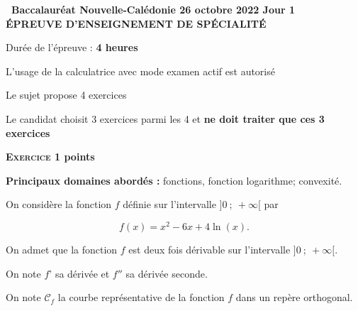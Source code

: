 \documentclass[10pt,a4paper]{article}
\begin{document}
\begin{center}{\Large\textbf{\decofourleft~Baccalauréat Nouvelle-Calédonie 26 octobre 2022 Jour 1~\decofourright\\[7pt] ÉPREUVE D'ENSEIGNEMENT DE SPÉCIALITÉ }}

\bigskip

Durée de l'épreuve : \textbf{4 heures}

\medskip

L'usage de la calculatrice avec mode examen actif est autorisé

\medskip

Le sujet propose 4 exercices

Le candidat choisit 3 exercices parmi les 4 et \textbf{ne doit traiter que ces 3 exercices}
\end{center}

\bigskip

\textbf{\textsc{Exercice 1}  points\hfill}

\medskip

\textbf{Principaux domaines abordés :} fonctions, fonction logarithme; convexité.

\medskip

On considère la fonction $f$ définie sur l'intervalle $]0~;~+\infty[$ par

\[f(x) = x^2 - 6x + 4\ln (x).\]

On admet que la fonction $f$ est deux fois dérivable sur l'intervalle $]0~;~+ \infty[$.

On note $f$' sa dérivée et $f''$ sa dérivée seconde.

On note $\mathcal{C}_f$ la courbe représentative de la fonction $f$ dans un repère orthogonal.

\medskip
\end{document}
